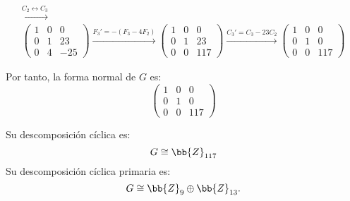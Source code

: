 \begin{ejercicio}
\begin{enumerate}
\begin{multline*}
            \xrightarrow{C_2\leftrightarrow C_3}\\
            \begin{pmatrix}
                1 & 0 & 0 \\
                0 & 1 & 23 \\
                0 & 4 & -25
            \end{pmatrix}
            \xrightarrow{F_3'=-(F_3-4F_2)}
            \begin{pmatrix}
                1 & 0 & 0 \\
                0 & 1 & 23 \\
                0 & 0 & 117
            \end{pmatrix}
            \xrightarrow{C_3'=C_3-23C_2}
            \begin{pmatrix}
                1 & 0 & 0 \\
                0 & 1 & 0 \\
                0 & 0 & 117
            \end{pmatrix}
        \end{multline*}

        Por tanto, la forma normal de $G$ es:
        \begin{equation*}
            \begin{pmatrix}
                1 & 0 & 0 \\
                0 & 1 & 0 \\
                0 & 0 & 117
            \end{pmatrix}
        \end{equation*}
        
        Su descomposición cíclica es:
        \begin{equation*}
            G \cong \bb{Z}_{117}
        \end{equation*}
        Su descomposición cíclica primaria es:
        \begin{equation*}
            G \cong \bb{Z}_9 \oplus \bb{Z}_{13}.
        \end{equation*}


\end{enumerate}
\end{ejercicio}

